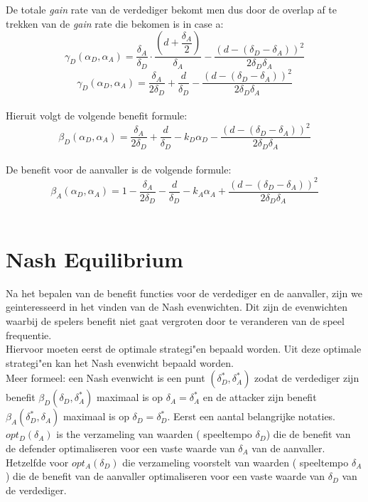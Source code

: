 \documentclass[master=cws, masteroption=vs,english]{kulemt}
\begin{document}
\begin{abstract*}
De totale \textit{gain} rate van de verdediger bekomt men dus door de overlap af te trekken van de \textit{gain} rate die bekomen is in case a:
 \begin{equation}\label{first}
\gamma_{D}(\alpha_{D},\alpha_{A}) = \dfrac{\delta_{A}}{\delta_{D}} \cdot \dfrac{(d+\dfrac{\delta_{A}}{2})}{\delta_{A}} - \dfrac{(d - (\delta_{D} - \delta_{A}))^{2}}{2 \delta_{D} \delta_{A}}
\end{equation}
\begin{equation}\label{first}
\gamma_{D}(\alpha_{D},\alpha_{A}) = \dfrac{\delta_{A}}{2\delta_{D}} + \dfrac{d}{\delta_{D}} - \dfrac{(d - (\delta_{D} - \delta_{A}))^{2}}{2 \delta_{D} \delta_{A}}
\end{equation}\\
Hieruit volgt de volgende benefit formule:
\begin{equation}\label{first}
\beta_{D}(\alpha_{D},\alpha_{A}) = \dfrac{\delta_{A}}{2\delta_{D}} + \dfrac{d}{\delta_{D}} - k_{D} \alpha_{D} - \dfrac{(d - (\delta_{D} - \delta_{A}))^{2}}{2 \delta_{D} \delta_{A}}
\end{equation}\\
 
De benefit voor de aanvaller is de volgende formule:
\begin{equation}\label{first}
\beta_{A}(\alpha_{D},\alpha_{A}) = 1 -\dfrac{\delta_{A}}{2\delta_{D}} - \dfrac{d}{\delta_{D}} - k_{A} \alpha_{A} + \dfrac{(d - (\delta_{D} - \delta_{A}))^{2}}{2 \delta_{D} \delta_{A}}
\end{equation}\\


\section{Nash Equilibrium}
Na het bepalen van de benefit functies voor de verdediger en de aanvaller, zijn we geinteresseerd in het vinden van de Nash evenwichten. Dit zijn de evenwichten waarbij de spelers benefit niet gaat vergroten door te veranderen van de speel frequentie.  \\
Hiervoor moeten eerst de optimale strategi"en bepaald worden. Uit deze optimale strategi"en kan het Nash evenwicht bepaald worden. \\

Meer formeel: een Nash evenwicht is een punt $(\delta_{D}^{*},\delta_{A}^{*})$ zodat de verdediger zijn benefit $\beta_{D}(\delta_{D},\delta_{A}^{*})$ maximaal is op $\delta_{A}=\delta_{A}^{*}$ en de attacker zijn benefit $\beta_{A}(\delta_{D}^{*}, \delta_{A})$ maximaal is op $\delta_{D}=\delta_{D}^{*}$. Eerst een aantal belangrijke notaties. $opt_{D}(\delta_{A})$ is the verzameling van waarden ( speeltempo $\delta_{D}$) die de benefit van de defender optimaliseren voor een vaste waarde van $\delta_{A}$ van de aanvaller. Hetzelfde voor $opt_{A}(\delta_{D})$ die verzameling voorstelt van waarden ( speeltempo $\delta_{A}$) die de benefit van de aanvaller optimaliseren voor een vaste waarde van $\delta_{D}$ van de verdediger.\\


\end{abstract*}
\end{document}
